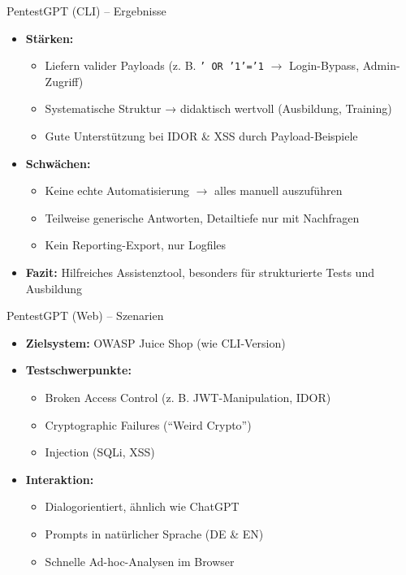 \documentclass[
	aspectratio=169,	%
	onlytextwidth,		%
	t,					%
	]{beamer}
\begin{document}
\begin{frame}{PentestGPT (CLI) – Ergebnisse}
	\begin{itemize}
		\item \textbf{Stärken:}
		\begin{itemize}
			\item Liefern valider Payloads (z. B. \texttt{' OR '1'='1} $\rightarrow$ Login-Bypass, Admin-Zugriff)
			\item Systematische Struktur → didaktisch wertvoll (Ausbildung, Training)
			\item Gute Unterstützung bei IDOR \& XSS durch Payload-Beispiele
		\end{itemize}
		
		\item \textbf{Schwächen:}
		\begin{itemize}
			\item Keine echte Automatisierung $\rightarrow$  alles manuell auszuführen
			\item Teilweise generische Antworten, Detailtiefe nur mit Nachfragen
			\item Kein Reporting-Export, nur Logfiles
		\end{itemize}
		
		\item \textbf{Fazit:}  
		Hilfreiches Assistenztool, besonders für strukturierte Tests und Ausbildung
	\end{itemize}
\end{frame}













\begin{frame}{PentestGPT (Web) – Szenarien}
	\begin{itemize}
		\item \textbf{Zielsystem:} OWASP Juice Shop (wie CLI-Version)
		
		\item \textbf{Testschwerpunkte:}
		\begin{itemize}
			\item Broken Access Control (z. B. JWT-Manipulation, IDOR)
			\item Cryptographic Failures (\enquote{Weird Crypto})
			\item Injection (SQLi, XSS)
		\end{itemize}
		
		\item \textbf{Interaktion:}
		\begin{itemize}
			\item Dialogorientiert, ähnlich wie ChatGPT
			\item Prompts in natürlicher Sprache (DE \& EN)
			\item Schnelle Ad-hoc-Analysen im Browser
		\end{itemize}
	\end{itemize}

\end{frame}
\end{document}
